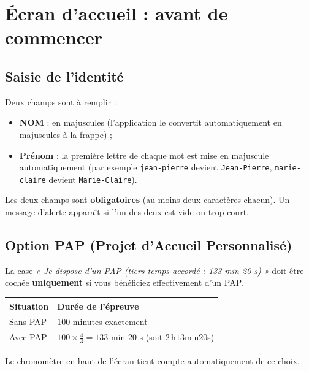 \documentclass[11pt,a4paper]{article}
\begin{document}
\section{Écran d'accueil : avant de commencer}

\subsection{Saisie de l'identité}

Deux champs sont à remplir :
\begin{itemize}
  \item \textbf{NOM} : en majuscules (l'application le convertit
        automatiquement en majuscules à la frappe) ;
  \item \textbf{Prénom} : la première lettre de chaque mot est mise en
        majuscule automatiquement (par exemple \texttt{jean-pierre} devient
        \texttt{Jean-Pierre}, \texttt{marie-claire} devient \texttt{Marie-Claire}).
\end{itemize}

\begin{attention}
Les deux champs sont \textbf{obligatoires} (au moins deux caractères chacun).
Un message d'alerte apparaît si l'un des deux est vide ou trop court.
\end{attention}

\subsection{Option PAP (Projet d'Accueil Personnalisé)}

La case \emph{« Je dispose d'un PAP (tiers-temps accordé : 133 min 20 s) »} doit
être cochée \textbf{uniquement} si vous bénéficiez effectivement d'un PAP.

\begin{center}
\begin{tabular}{ll}
\toprule
\textbf{Situation} & \textbf{Durée de l'épreuve} \\
\midrule
Sans PAP  & \(100\) minutes exactement \\
Avec PAP  & \(100 \times \tfrac{4}{3} = 133\) min \(20\) s (soit \(2\,\)h\(13\)min\(20\)s) \\
\bottomrule
\end{tabular}
\end{center}

Le chronomètre en haut de l'écran tient compte automatiquement de ce choix.
\end{document}
